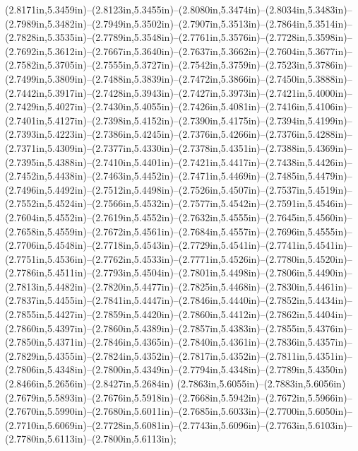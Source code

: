 (2.8171in,5.3459in)--(2.8123in,5.3455in)--(2.8080in,5.3474in)--(2.8034in,5.3483in)--(2.7989in,5.3482in)--(2.7949in,5.3502in)--(2.7907in,5.3513in)--(2.7864in,5.3514in)--(2.7828in,5.3535in)--(2.7789in,5.3548in)--(2.7761in,5.3576in)--(2.7728in,5.3598in)--(2.7692in,5.3612in)--(2.7667in,5.3640in)--(2.7637in,5.3662in)--(2.7604in,5.3677in)--(2.7582in,5.3705in)--(2.7555in,5.3727in)--(2.7542in,5.3759in)--(2.7523in,5.3786in)--(2.7499in,5.3809in)--(2.7488in,5.3839in)--(2.7472in,5.3866in)--(2.7450in,5.3888in)--(2.7442in,5.3917in)--(2.7428in,5.3943in)--(2.7427in,5.3973in)--(2.7421in,5.4000in)--(2.7429in,5.4027in)--(2.7430in,5.4055in)--(2.7426in,5.4081in)--(2.7416in,5.4106in)--(2.7401in,5.4127in)--(2.7398in,5.4152in)--(2.7390in,5.4175in)--(2.7394in,5.4199in)--(2.7393in,5.4223in)--(2.7386in,5.4245in)--(2.7376in,5.4266in)--(2.7376in,5.4288in)--(2.7371in,5.4309in)--(2.7377in,5.4330in)--(2.7378in,5.4351in)--(2.7388in,5.4369in)--(2.7395in,5.4388in)--(2.7410in,5.4401in)--(2.7421in,5.4417in)--(2.7438in,5.4426in)--(2.7452in,5.4438in)--(2.7463in,5.4452in)--(2.7471in,5.4469in)--(2.7485in,5.4479in)--(2.7496in,5.4492in)--(2.7512in,5.4498in)--(2.7526in,5.4507in)--(2.7537in,5.4519in)--(2.7552in,5.4524in)--(2.7566in,5.4532in)--(2.7577in,5.4542in)--(2.7591in,5.4546in)--(2.7604in,5.4552in)--(2.7619in,5.4552in)--(2.7632in,5.4555in)--(2.7645in,5.4560in)--(2.7658in,5.4559in)--(2.7672in,5.4561in)--(2.7684in,5.4557in)--(2.7696in,5.4555in)--(2.7706in,5.4548in)--(2.7718in,5.4543in)--(2.7729in,5.4541in)--(2.7741in,5.4541in)--(2.7751in,5.4536in)--(2.7762in,5.4533in)--(2.7771in,5.4526in)--(2.7780in,5.4520in)--(2.7786in,5.4511in)--(2.7793in,5.4504in)--(2.7801in,5.4498in)--(2.7806in,5.4490in)--(2.7813in,5.4482in)--(2.7820in,5.4477in)--(2.7825in,5.4468in)--(2.7830in,5.4461in)--(2.7837in,5.4455in)--(2.7841in,5.4447in)--(2.7846in,5.4440in)--(2.7852in,5.4434in)--(2.7855in,5.4427in)--(2.7859in,5.4420in)--(2.7860in,5.4412in)--(2.7862in,5.4404in)--(2.7860in,5.4397in)--(2.7860in,5.4389in)--(2.7857in,5.4383in)--(2.7855in,5.4376in)--(2.7850in,5.4371in)--(2.7846in,5.4365in)--(2.7840in,5.4361in)--(2.7836in,5.4357in)--(2.7829in,5.4355in)--(2.7824in,5.4352in)--(2.7817in,5.4352in)--(2.7811in,5.4351in)--(2.7806in,5.4348in)--(2.7800in,5.4349in)--(2.7794in,5.4348in)--(2.7789in,5.4350in) (2.8466in,5.2656in)--(2.8427in,5.2684in) (2.7863in,5.6055in)--(2.7883in,5.6056in) (2.7679in,5.5893in)--(2.7676in,5.5918in)--(2.7668in,5.5942in)--(2.7672in,5.5966in)--(2.7670in,5.5990in)--(2.7680in,5.6011in)--(2.7685in,5.6033in)--(2.7700in,5.6050in)--(2.7710in,5.6069in)--(2.7728in,5.6081in)--(2.7743in,5.6096in)--(2.7763in,5.6103in)--(2.7780in,5.6113in)--(2.7800in,5.6113in);

